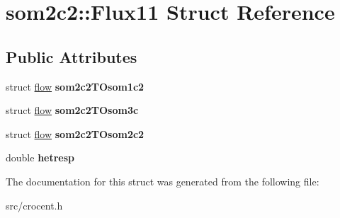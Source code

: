 \hypertarget{structsom2c2_1_1_flux11}{\section{som2c2\-:\-:Flux11 Struct Reference}
\label{structsom2c2_1_1_flux11}
}
\subsection*{Public Attributes}
\begin{DoxyCompactItemize}
\item 
\hypertarget{structsom2c2_1_1_flux11_a996cbe41c54576f631370a6d94e18a5a}{struct \hyperlink{structflow}{flow} {\bfseries som2c2\-T\-Osom1c2}}\label{structsom2c2_1_1_flux11_a996cbe41c54576f631370a6d94e18a5a}

\item 
\hypertarget{structsom2c2_1_1_flux11_a57a703d269e6dae4f183691f9e769059}{struct \hyperlink{structflow}{flow} {\bfseries som2c2\-T\-Osom3c}}\label{structsom2c2_1_1_flux11_a57a703d269e6dae4f183691f9e769059}

\item 
\hypertarget{structsom2c2_1_1_flux11_a61af2c0b2655eaad0eb43bee80664dbe}{struct \hyperlink{structflow}{flow} {\bfseries som2c2\-T\-Osom2c2}}\label{structsom2c2_1_1_flux11_a61af2c0b2655eaad0eb43bee80664dbe}

\item 
\hypertarget{structsom2c2_1_1_flux11_a559a121cc4672a845fce0a96ef7e3206}{double {\bfseries hetresp}}\label{structsom2c2_1_1_flux11_a559a121cc4672a845fce0a96ef7e3206}

\end{DoxyCompactItemize}


The documentation for this struct was generated from the following file\-:\begin{DoxyCompactItemize}
\item 
src/crocent.\-h\end{DoxyCompactItemize}
